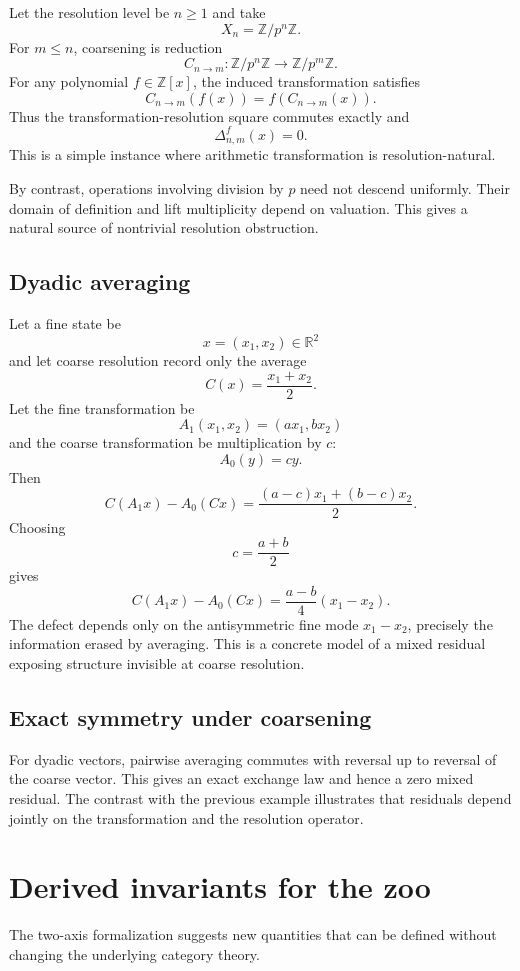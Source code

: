\documentclass[11pt]{article}
\theoremstyle{definition}
\theoremstyle{remark}
\begin{document}
Let the resolution level be $n\ge1$ and take
\[
X_n=\mathbb Z/p^n\mathbb Z.
\]
For $m\le n$, coarsening is reduction
\[
C_{n\to m}:\mathbb Z/p^n\mathbb Z\to\mathbb Z/p^m\mathbb Z.
\]
For any polynomial $f\in\mathbb Z[x]$, the induced transformation satisfies
\[
C_{n\to m}(f(x))
=
f(C_{n\to m}(x)).
\]
Thus the transformation-resolution square commutes exactly and
\[
\Delta^f_{n,m}(x)=0.
\]
This is a simple instance where arithmetic transformation is resolution-natural.

By contrast, operations involving division by $p$ need not descend uniformly. Their domain of definition and lift multiplicity depend on valuation. This gives a natural source of nontrivial resolution obstruction.

\subsection{Dyadic averaging}

Let a fine state be
\[
x=(x_1,x_2)\in\mathbb R^2
\]
and let coarse resolution record only the average
\[
C(x)=\frac{x_1+x_2}{2}.
\]
Let the fine transformation be
\[
A_1(x_1,x_2)=(ax_1,bx_2)
\]
and the coarse transformation be multiplication by $c$:
\[
A_0(y)=cy.
\]
Then
\[
C(A_1x)-A_0(Cx)
=
\frac{(a-c)x_1+(b-c)x_2}{2}.
\]
Choosing
\[
c=\frac{a+b}{2}
\]
gives
\[
C(A_1x)-A_0(Cx)
=
\frac{a-b}{4}(x_1-x_2).
\]
The defect depends only on the antisymmetric fine mode $x_1-x_2$, precisely the information erased by averaging. This is a concrete model of a mixed residual exposing structure invisible at coarse resolution.

\subsection{Exact symmetry under coarsening}

For dyadic vectors, pairwise averaging commutes with reversal up to reversal of the coarse vector. This gives an exact exchange law and hence a zero mixed residual. The contrast with the previous example illustrates that residuals depend jointly on the transformation and the resolution operator.

\section{Derived invariants for the zoo}

The two-axis formalization suggests new quantities that can be defined without changing the underlying category theory.
\end{document}
